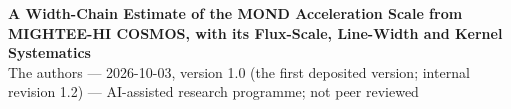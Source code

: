 \documentclass[10pt]{article}
\begin{document}
\begin{center}
{\Large\bfseries A Width-Chain Estimate of the MOND Acceleration Scale from MIGHTEE-HI COSMOS, with its Flux-Scale, Line-Width and Kernel Systematics}\\[6pt]
{\small The authors --- 2026-10-03, version 1.0 (the first deposited version; internal revision 1.2) --- AI-assisted research programme; not peer reviewed}
\end{center}

\end{document}
